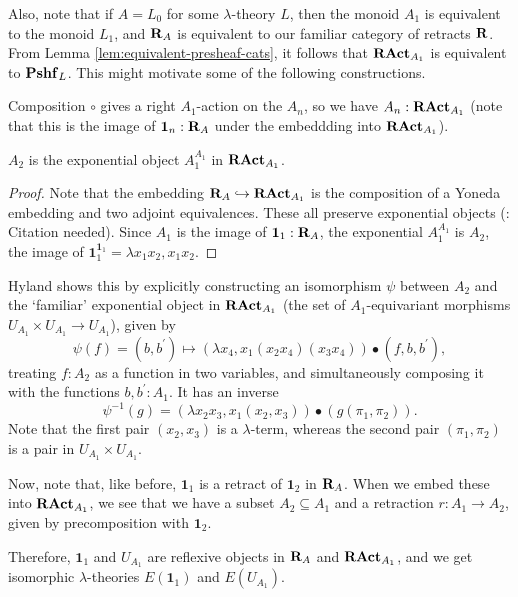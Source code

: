 \begin{remark}
  Also, note that if $ A = L_0 $ for some $ \lambda $-theory $ L $, then the monoid $ A_1 $ is equivalent to the monoid $ L_1 $, and $ \mathbf{R}_A $ is equivalent to our familiar category of retracts $ \mathbf{R} $. From Lemma \ref{lem:equivalent-presheaf-cats}, it follows that $ \mathbf{RAct}_{A_1} $ is equivalent to $ \mathbf{Pshf}_{L} $. This might motivate some of the following constructions.
\end{remark}

\begin{definition}
  Composition $ \circ $ gives a right $ A_1 $-action on the $ A_n $, so we have $ A_n : \mathbf{RAct}_{A_1} $ (note that this is the image of $ \mathbf 1_n : \mathbf{R}_A $ under the embeddding into $ \mathbf{RAct}_{A_1} $).
\end{definition}

\begin{lemma}
  $ A_2 $ is the exponential object $ A_1^{A_1} $ in $ \mathbf{RAct}_{A_1} $.
\end{lemma}
\begin{proof}
  Note that the embedding $ \mathbf{R}_A \hookrightarrow \mathbf{RAct}_{A_1} $ is the composition of a Yoneda embedding and two adjoint equivalences. These all preserve exponential objects (\TODO: Citation needed). Since $ A_1 $ is the image of $ \mathbf 1_1 : \mathbf{R}_A $, the exponential $ A_1^{A_1} $ is $ A_2 $, the image of $ \mathbf 1_1^{\mathbf 1_1} = \lambda x_1 x_2, x_1 x_2 $.
\end{proof}

\begin{remark}
  Hyland shows this by explicitly constructing an isomorphism $ \psi $ between $ A_2 $ and the `familiar' exponential object in $ \mathbf{RAct}_{A_1} $ (the set of $ A_1 $-equivariant morphisms $ U_{A_1} \times U_{A_1} \to U_{A_1} $), given by
  \[ \psi(f) = (b, b^\prime) \mapsto (\lambda x_4, x_1 (x_2 x_4) (x_3 x_4)) \bullet (f, b, b^\prime), \]
  treating $ f : A_2 $ as a function in two variables, and simultaneously composing it with the functions $ b, b^\prime : A_1 $. It has an inverse
  \[ \psi^{-1}(g) = (\lambda x_2 x_3, x_1 (x_2, x_3)) \bullet (g(\pi_1, \pi_2)). \]
  Note that the first pair $ (x_2, x_3) $ is a $ \lambda $-term, whereas the second pair $ (\pi_1, \pi_2) $ is a pair in $ U_{A_1} \times U_{A_1} $.
\end{remark}

\begin{definition}
  Now, note that, like before, $ \mathbf 1_1 $ is a retract of $ \mathbf 1_2 $ in $ \mathbf{R}_A $. When we embed these into $ \mathbf{RAct}_{A_1} $, we see that we have a subset $ A_2 \subseteq A_1 $ and a retraction $ r: A_1 \to A_2 $, given by precomposition with $ \mathbf 1_2 $.

  Therefore, $ \mathbf 1_1 $ and $ U_{A_1} $ are reflexive objects in $ \mathbf{R}_A $ and $ \mathbf{RAct}_{A_1} $, and we get isomorphic $ \lambda $-theories $ E(\mathbf 1_1) $ and $ E(U_{A_1}) $.
\end{definition}

